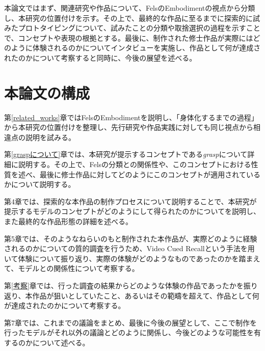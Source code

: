 
本論文ではまず、関連研究や作品について、FelsのEmbodimentの視点から分類し、本研究の位置付けを示す。その上で、最終的な作品に至るまでに探索的に試みたプロトタイピングについて、試みたことの分類や取捨選択の過程を示すことで、コンセプトや表現の根拠とする。最後に、制作された修士作品が実際にはどのように体験されるのかについてインタビューを実施し、作品として何が達成されたのかについて考察すると同時に、今後の展望を述べる。

\section{本論文の構成}
第\ref{related_works}章ではFelsのEmbodimentを説明し、「身体化するまでの過程」から本研究の位置付けを整理し、先行研究や作品実践に対しても同じ視点から相違点の説明を試みる。

第\ref{graspについて}章では、本研究が提示するコンセプトである\textit{grasp}について詳細に説明する。その上で、Felsの分類との関係性や、このコンセプトにおける性質を述べ、最後に修士作品に対してどのようにこのコンセプトが適用されているかについて説明する。

第4章では、探索的な本作品の制作プロセスについて説明することで、本研究が提示するモデルのコンセプトがどのようにして得られたのかについてを説明し、また最終的な作品形態の詳細を述べる。

第5章では、そのようなねらいのもと制作された本作品が、実際どのように経験されるのかについての質的調査を行うため、Video Cued Recallという手法を用いて体験について振り返り、実際の体験がどのようなものであったのかを踏まえて、モデルとの関係性について考察する。

第\ref{考察}章では、行った調査の結果からどのような体験の作品であったかを振り返り、本作品が狙いとしていたこと、あるいはその範疇を超えて、作品として何が達成されたのかについて考察する。

第7章では、これまでの議論をまとめ、最後に今後の展望として、ここで制作を行ったモデルがそれ以外の議論とどのように関係し、今後どのような可能性を有するのかについて述べる。